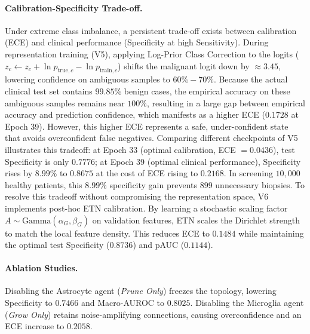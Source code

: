 \documentclass[letterpaper]{article} %
\begin{document}
\paragraph{Calibration-Specificity Trade-off.}
Under extreme class imbalance, a persistent trade-off exists between calibration (ECE) and clinical performance (Specificity at high Sensitivity). During representation training (V5), applying Log-Prior Class Correction to the logits ($z_c \leftarrow z_c + \ln p_{\text{true},c} - \ln p_{\text{train},c}$) shifts the malignant logit down by $\approx 3.45$, lowering confidence on ambiguous samples to $60\%-70\%$. Because the actual clinical test set contains $99.85\%$ benign cases, the empirical accuracy on these ambiguous samples remains near $100\%$, resulting in a large gap between empirical accuracy and prediction confidence, which manifests as a higher ECE ($0.1728$ at Epoch 39). 
However, this higher ECE represents a safe, under-confident state that avoids overconfident false negatives. Comparing different checkpoints of V5 illustrates this tradeoff: at Epoch 33 (optimal calibration, ECE $= 0.0436$), test Specificity is only $0.7776$; at Epoch 39 (optimal clinical performance), Specificity rises by $8.99\%$ to $0.8675$ at the cost of ECE rising to $0.2168$. In screening $10,000$ healthy patients, this $8.99\%$ specificity gain prevents $899$ unnecessary biopsies. 
To resolve this tradeoff without compromising the representation space, V6 implements post-hoc ETN calibration. By learning a stochastic scaling factor $A \sim \text{Gamma}(\alpha_G, \beta_G)$ on validation features, ETN scales the Dirichlet strength to match the local feature density. This reduces ECE to $0.1484$ while maintaining the optimal test Specificity ($0.8736$) and pAUC ($0.1144$).

\paragraph{Ablation Studies.} Disabling the Astrocyte agent (\emph{Prune Only}) freezes the topology, lowering Specificity to $0.7466$ and Macro-AUROC to $0.8025$. Disabling the Microglia agent (\emph{Grow Only}) retains noise-amplifying connections, causing overconfidence and an ECE increase to $0.2058$.
\end{document}
